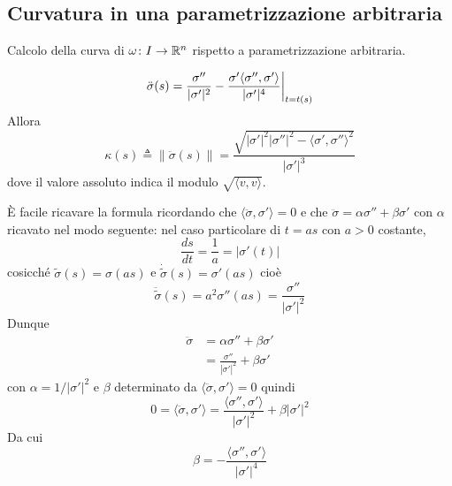 \documentclass[a4paper]{article}
\begin{document}
\subsection{Curvatura in una parametrizzazione arbitraria}

Calcolo della curva di \(\omega \colon I \to \mathbb{R}^n\)
rispetto a parametrizzazione arbitraria.

\begin{snippetproposition}{}
    \[
        \ddot{\sigma}(s) = \restr{
            \frac{\sigma''}{
            |\sigma'|^2
        } - \frac{
            \sigma' \langle\sigma'', \sigma'\rangle
        }{
            |\sigma'|^4
        }
        }{
            t = t(s)
        }
    \]
    Allora
    \[
        \kappa(s) \triangleq \|\ddot{\sigma}(s)\| = \frac{
            \sqrt{|\sigma'|^2|\sigma''|^2 - \langle\sigma', \sigma''\rangle^2}
        }{
            |\sigma'|^3
        }
    \]
    dove il valore assoluto indica il modulo \(\sqrt{\langle v, v \rangle}\).
\end{snippetproposition}

È facile ricavare la formula ricordando che \(\langle \ddot \sigma, \sigma'\rangle = 0\)
e che \(\ddot \sigma = \alpha \sigma'' + \beta \sigma'\)
con \(\alpha\) ricavato nel modo seguente:
nel caso particolare di \(t = as\) con \(a>0\) costante,
\[
    \frac{ds}{dt} = \frac1a = |\sigma'(t)|
\]
cosicché \(\tilde \sigma(s) = \sigma(as)\) e \(\dot{\tilde{\sigma}}(s) = \sigma'(as)\)
cioè
\[
    \ddot{\tilde{\sigma}}(s) = a^2 \sigma''(as) = \frac{\sigma''}{|\sigma'|^2}
\]
Dunque \begin{align*}
    \ddot\sigma &= \alpha\sigma'' + \beta\sigma' \\
    &= \frac{\sigma''}{|\sigma'|^2} + \beta\sigma'
\end{align*}
con \(\alpha = 1 / |\sigma'|^2\)
e  \(\beta\) determinato da \(\langle \ddot \sigma, \sigma' \rangle = 0\)
quindi
\[
    0 = \langle \ddot\sigma, \sigma'\rangle = \frac{\langle \sigma'',\sigma'\rangle}{|\sigma'|^2}
    + \beta |\sigma'|^2
\]
Da cui
\[
    \beta = - \frac{\langle \sigma'', \sigma'\rangle}{|\sigma'|^4}
\]
\end{document}
